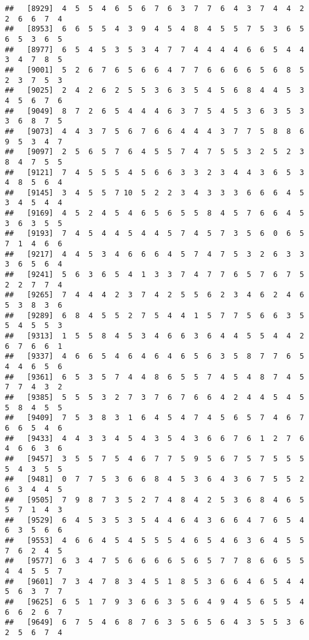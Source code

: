 \documentclass[
]{book}
\begin{document}
\begin{verbatim}
##   [8929]  4  5  5  4  6  5  6  7  6  3  7  7  6  4  3  7  4  4  2  2  6  6  7  4
##   [8953]  6  6  5  5  4  3  9  4  5  4  8  4  5  5  7  5  3  6  5  6  5  3  6  5
##   [8977]  6  5  4  5  3  5  3  4  7  7  4  4  4  4  6  6  5  4  4  3  4  7  8  5
##   [9001]  5  2  6  7  6  5  6  6  4  7  7  6  6  6  6  5  6  8  5  2  3  7  5  3
##   [9025]  2  4  2  6  2  5  5  3  6  3  5  4  5  6  8  4  4  5  3  4  5  6  7  6
##   [9049]  8  7  2  6  5  4  4  4  6  3  7  5  4  5  3  6  3  5  3  3  6  8  7  5
##   [9073]  4  4  3  7  5  6  7  6  6  4  4  4  3  7  7  5  8  8  6  9  5  3  4  7
##   [9097]  2  5  6  5  7  6  4  5  5  7  4  7  5  5  3  2  5  2  3  8  4  7  5  5
##   [9121]  7  4  5  5  5  4  5  6  6  3  3  2  3  4  4  3  6  5  3  4  8  5  6  4
##   [9145]  3  4  5  5  7 10  5  2  2  3  4  3  3  3  6  6  6  4  5  3  4  5  4  4
##   [9169]  4  5  2  4  5  4  6  5  6  5  5  8  4  5  7  6  6  4  5  3  6  3  5  5
##   [9193]  7  4  5  4  4  5  4  4  5  7  4  5  7  3  5  6  0  6  5  7  1  4  6  6
##   [9217]  4  4  5  3  4  6  6  6  4  5  7  4  7  5  3  2  6  3  3  3  6  5  6  4
##   [9241]  5  6  3  6  5  4  1  3  3  7  4  7  7  6  5  7  6  7  5  2  2  7  7  4
##   [9265]  7  4  4  4  2  3  7  4  2  5  5  6  2  3  4  6  2  4  6  5  3  8  3  6
##   [9289]  6  8  4  5  5  2  7  5  4  4  1  5  7  7  5  6  6  3  5  5  4  5  5  3
##   [9313]  1  5  5  8  4  5  3  4  6  6  3  6  4  4  5  5  4  4  2  6  7  6  6  1
##   [9337]  4  6  6  5  4  6  4  6  4  6  5  6  3  5  8  7  7  6  5  4  4  6  5  6
##   [9361]  6  5  3  5  7  4  4  8  6  5  5  7  4  5  4  8  7  4  5  7  7  4  3  2
##   [9385]  5  5  5  3  2  7  3  7  6  7  6  6  4  2  4  4  5  4  5  5  8  4  5  5
##   [9409]  7  5  3  8  3  1  6  4  5  4  7  4  5  6  5  7  4  6  7  6  6  5  4  6
##   [9433]  4  4  3  3  4  5  4  3  5  4  3  6  6  7  6  1  2  7  6  4  6  6  3  6
##   [9457]  3  5  5  7  5  4  6  7  7  5  9  5  6  7  5  7  5  5  5  5  4  3  5  5
##   [9481]  0  7  7  5  3  6  6  8  4  5  3  6  4  3  6  7  5  5  2  6  3  4  4  5
##   [9505]  7  9  8  7  3  5  2  7  4  8  4  2  5  3  6  8  4  6  5  5  7  1  4  3
##   [9529]  6  4  5  3  5  3  5  4  4  6  4  3  6  6  4  7  6  5  4  6  3  5  6  6
##   [9553]  4  6  6  4  5  4  5  5  5  4  6  5  4  6  3  6  4  5  5  7  6  2  4  5
##   [9577]  6  3  4  7  5  6  6  6  6  5  6  5  7  7  8  6  6  5  5  4  4  5  5  7
##   [9601]  7  3  4  7  8  3  4  5  1  8  5  3  6  6  4  6  5  4  4  5  6  3  7  7
##   [9625]  6  5  1  7  9  3  6  6  3  5  6  4  9  4  5  6  5  5  4  6  6  2  6  7
##   [9649]  6  7  5  4  6  8  7  6  3  5  6  5  6  4  3  5  5  3  6  2  5  6  7  4

\end{verbatim}
\end{document}
